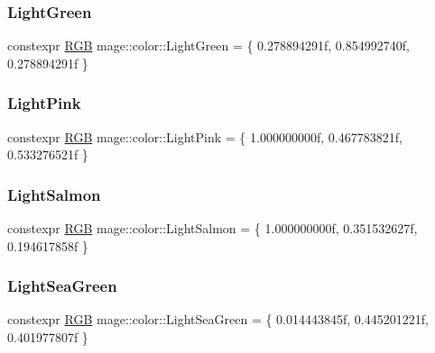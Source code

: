 \mbox{\label{namespacemage_1_1color_a8229e71bb1cae46b47e2c415ac4b43ea}} 
\subsubsection{\texorpdfstring{Light\+Green}{LightGreen}}
{\footnotesize\ttfamily constexpr \mbox{\hyperlink{structmage_1_1_r_g_b}{R\+GB}} mage\+::color\+::\+Light\+Green = \{ 0.\+278894291f, 0.\+854992740f, 0.\+278894291f \}}

\mbox{\label{namespacemage_1_1color_a2211bc4700514d59df25b53387aa1d32}} 
\subsubsection{\texorpdfstring{Light\+Pink}{LightPink}}
{\footnotesize\ttfamily constexpr \mbox{\hyperlink{structmage_1_1_r_g_b}{R\+GB}} mage\+::color\+::\+Light\+Pink = \{ 1.\+000000000f, 0.\+467783821f, 0.\+533276521f \}}

\mbox{\label{namespacemage_1_1color_a0ea813bec32974b56714ee519d3fd738}} 
\subsubsection{\texorpdfstring{Light\+Salmon}{LightSalmon}}
{\footnotesize\ttfamily constexpr \mbox{\hyperlink{structmage_1_1_r_g_b}{R\+GB}} mage\+::color\+::\+Light\+Salmon = \{ 1.\+000000000f, 0.\+351532627f, 0.\+194617858f \}}

\mbox{\label{namespacemage_1_1color_a1e3d4448a15e0fac347da747ad2647a2}} 
\subsubsection{\texorpdfstring{Light\+Sea\+Green}{LightSeaGreen}}
{\footnotesize\ttfamily constexpr \mbox{\hyperlink{structmage_1_1_r_g_b}{R\+GB}} mage\+::color\+::\+Light\+Sea\+Green = \{ 0.\+014443845f, 0.\+445201221f, 0.\+401977807f \}}

